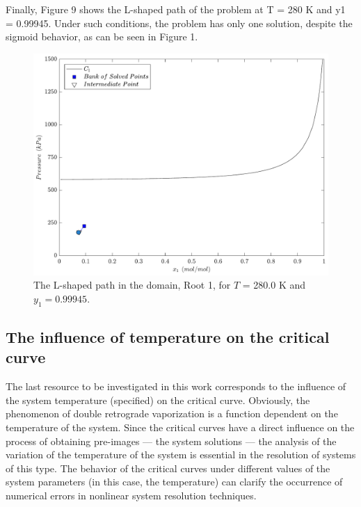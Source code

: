 \documentclass[journal=iecred,manuscript=article]{achemso}
\theoremstyle{definition}
\theoremstyle{remark}
\begin{document}
Finally, Figure 9 shows the L-shaped path of the problem at T = 280 K and y1 = 0.99945. Under such conditions, the problem has only one solution, despite the sigmoid behavior, as can be seen in Figure 1.

\begin{figure}[!ht]
	\begin{center}
		\includegraphics[scale=0.50]{caminhos_L_degeneracao_dominio3.pdf}
		\caption{The L-shaped path in the domain, Root 1, for $T$ = 280.0 K and $y_1 = 0.99945$.}\label{fig:L_S2}
	\end{center}
\end{figure}


\subsection{The influence of temperature on the critical curve}

The last resource to be investigated in this work corresponds to the influence of the system temperature (specified) on the critical curve. Obviously, the phenomenon of double retrograde vaporization is a function dependent on the temperature of the system. Since the critical curves have a direct influence on the process of obtaining pre-images --- the system solutions --- the analysis of the variation of the temperature of the system is essential in the resolution of systems of this type. The behavior of the critical curves under different values of the system parameters (in this case, the temperature) can clarify the occurrence of numerical errors in nonlinear system resolution techniques.
\end{document}
